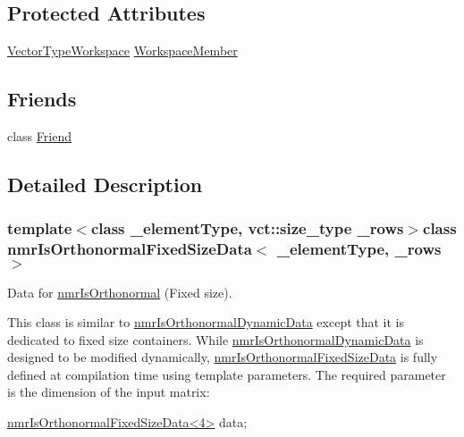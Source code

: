 \subsection*{Protected Attributes}
\begin{DoxyCompactItemize}
\item 
\hyperlink{classnmr_is_orthonormal_fixed_size_data_a9c2423d8da4e6400b83e1425454bbbe3}{Vector\-Type\-Workspace} \hyperlink{classnmr_is_orthonormal_fixed_size_data_a482c2819e75c1c6fe359e7b22b6d1a63}{Workspace\-Member}
\end{DoxyCompactItemize}
\subsection*{Friends}
\begin{DoxyCompactItemize}
\item 
class \hyperlink{classnmr_is_orthonormal_fixed_size_data_a7f8321d57e81bc613d5dbef3410ba70e}{Friend}
\end{DoxyCompactItemize}


\subsection{Detailed Description}
\subsubsection*{template$<$class \-\_\-element\-Type, vct\-::size\-\_\-type \-\_\-rows$>$class nmr\-Is\-Orthonormal\-Fixed\-Size\-Data$<$ \-\_\-element\-Type, \-\_\-rows $>$}

Data for \hyperlink{nmr_is_orthonormal_8h_acf0ff1e2dbe0c988db04d9db1e2e7697}{nmr\-Is\-Orthonormal} (Fixed size). 

This class is similar to \hyperlink{classnmr_is_orthonormal_dynamic_data}{nmr\-Is\-Orthonormal\-Dynamic\-Data} except that it is dedicated to fixed size containers. While \hyperlink{classnmr_is_orthonormal_dynamic_data}{nmr\-Is\-Orthonormal\-Dynamic\-Data} is designed to be modified dynamically, \hyperlink{classnmr_is_orthonormal_fixed_size_data}{nmr\-Is\-Orthonormal\-Fixed\-Size\-Data} is fully defined at compilation time using template parameters. The required parameter is the dimension of the input matrix\-: 
\begin{DoxyCode}
\hyperlink{classnmr_is_orthonormal_fixed_size_data}{nmrIsOrthonormalFixedSizeData<4>} data;
\end{DoxyCode}


